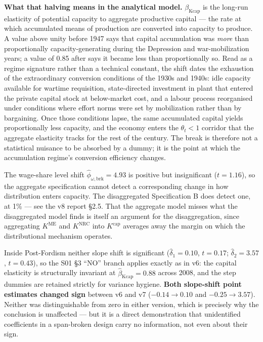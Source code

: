 \documentclass[11pt,a4paper]{article}
\begin{document}
\textbf{What that halving means in the analytical model.} $\beta_{\text{Kcap}}$ is the long-run elasticity of potential capacity to aggregate productive capital --- the rate at which accumulated means of production are converted into capacity to produce. A value above unity before 1947 says that capital accumulation was \textit{more} than proportionally capacity-generating during the Depression and war-mobilization years; a value of 0.85 after says it became less than proportionally so. Read as a regime signature rather than a technical constant, the shift dates the exhaustion of the extraordinary conversion conditions of the 1930s and 1940s: idle capacity available for wartime requisition, state-directed investment in plant that entered the private capital stock at below-market cost, and a labour process reorganised under conditions where effort norms were set by mobilization rather than by bargaining. Once those conditions lapse, the same accumulated capital yields proportionally less capacity, and the economy enters the $\theta_t < 1$ corridor that the aggregate elasticity tracks for the rest of the century. The break is therefore not a statistical nuisance to be absorbed by a dummy; it is the point at which the accumulation regime's conversion efficiency changes.

The wage-share level shift $\hat{\phi}_{\omega,\text{brk}} = 4.93$ is positive but insignificant ($t = 1.16$), so the aggregate specification cannot detect a corresponding change in how distribution enters capacity. The disaggregated Specification B does detect one, at 1\% --- see the v8 report \S2.5. That the aggregate model misses what the disaggregated model finds is itself an argument for the disaggregation, since aggregating $K^{\text{ME}}$ and $K^{\text{NRC}}$ into $K^{\text{cap}}$ averages away the margin on which the distributional mechanism operates.

Inside Post-Fordism neither slope shift is significant ($\hat{\delta}_1 = 0.10$, $t = 0.17$; $\hat{\delta}_2 = 3.57$, $t = 0.43$), so the S01 \S3 ``NO'' branch applies exactly as in v6: the capital elasticity is structurally invariant at $\hat{\beta}_{\text{Kcap}} = 0.88$ across 2008, and the step dummies are retained strictly for variance hygiene. \textbf{Both slope-shift point estimates changed sign} between v6 and v7 ($-0.14 \to 0.10$ and $-0.25 \to 3.57$). Neither was distinguishable from zero in either version, which is precisely why the conclusion is unaffected --- but it is a direct demonstration that unidentified coefficients in a span-broken design carry no information, not even about their sign.
\end{document}
